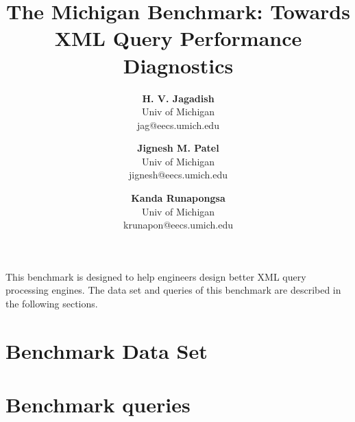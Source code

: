 \documentclass[fleqn,11pt]{article}
\title{\bf The Michigan Benchmark: Towards XML Query Performance Diagnostics}
\author{
{\bf H. V. Jagadish} \\
Univ of Michigan\\
jag@eecs.umich.edu
\and
{\bf Jignesh M. Patel}\\
Univ of Michigan\\
jignesh@eecs.umich.edu
\and
{\bf Kanda Runapongsa}\\
Univ of Michigan\\
krunapon@eecs.umich.edu
}
\begin{document}
\maketitle

This benchmark is designed to help engineers design better XML query processing engines.  The data set and queries of this benchmark are described in the following sections.

\section{Benchmark Data Set}


\section{Benchmark queries}
\label{sec:queries}

\end{document}
